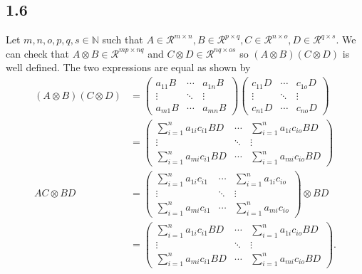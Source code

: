 \subsection*{1.6}
\begin{solution}
  Let $m,n,o,p,q,s \in \mathbb{N}$ such that
  $A \in \mathcal{R}^{m \times n}, B \in \mathcal{R}^{p \times q}, C \in \mathcal{R}^{n \times o}, D \in \mathcal{R}^{q \times s}$.
  We can check that
  $A \otimes B \in \mathcal{R}^{mp \times nq}$ and
  $C \otimes D \in \mathcal{R}^{nq \times os}$
  so $(A \otimes B) (C \otimes D)$ is well defined.
  The two expressions are equal as shown by
  \begin{align*}
    (A \otimes B) (C \otimes D)
    & =
    \begin{pmatrix}
      a_{11}B & \cdots & a_{1n}B\\
      \vdots  & \ddots & \vdots\\
      a_{m1}B & \cdots & a_{mn}B
    \end{pmatrix}
    \begin{pmatrix}
      c_{11}D & \cdots & c_{1o}D\\
      \vdots  & \ddots & \vdots\\
      c_{n1}D & \cdots & c_{no}D
    \end{pmatrix}\\
    & =
    \begin{pmatrix}
      \sum_{i=1}^n a_{1i}c_{i1}BD & \cdots & \sum_{i=1}^n a_{1i}c_{io}BD\\
      \vdots  & \ddots & \vdots\\
      \sum_{i=1}^n a_{mi}c_{i1}BD & \cdots & \sum_{i=1}^n a_{mi}c_{io}BD
    \end{pmatrix}\\
    AC \otimes BD
    & =
    \begin{pmatrix}
      \sum_{i=1}^n a_{1i}c_{i1} & \cdots & \sum_{i=1}^n a_{1i}c_{io}\\
      \vdots  & \ddots & \vdots\\
      \sum_{i=1}^n a_{mi}c_{i1} & \cdots & \sum_{i=1}^n a_{mi}c_{io}
    \end{pmatrix}
    \otimes BD\\
    & =
    \begin{pmatrix}
      \sum_{i=1}^n a_{1i}c_{i1}BD & \cdots & \sum_{i=1}^n a_{1i}c_{io}BD\\
      \vdots  & \ddots & \vdots\\
      \sum_{i=1}^n a_{mi}c_{i1}BD & \cdots & \sum_{i=1}^n a_{mi}c_{io}BD
    \end{pmatrix}.
  \end{align*}
\end{solution}


